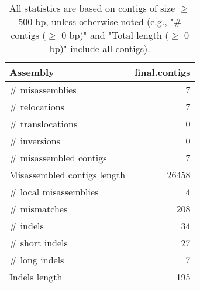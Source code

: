 \documentclass[12pt,a4paper]{article}
\begin{document}
\begin{table}[ht]
\begin{center}
\caption{All statistics are based on contigs of size $\geq$ 500 bp, unless otherwise noted (e.g., "\# contigs ($\geq$ 0 bp)" and "Total length ($\geq$ 0 bp)" include all contigs).}
\begin{tabular}{|l*{1}{|r}|}
\hline
Assembly & final.contigs \\ \hline
\# misassemblies & 7 \\ \hline
\hspace{5mm}\# relocations & 7 \\ \hline
\hspace{5mm}\# translocations & 0 \\ \hline
\hspace{5mm}\# inversions & 0 \\ \hline
\# misassembled contigs & 7 \\ \hline
Misassembled contigs length & 26458 \\ \hline
\# local misassemblies & 4 \\ \hline
\# mismatches & 208 \\ \hline
\# indels & 34 \\ \hline
\hspace{5mm}\# short indels & 27 \\ \hline
\hspace{5mm}\# long indels & 7 \\ \hline
Indels length & 195 \\ \hline
\end{tabular}
\end{center}
\end{table}
\end{document}
